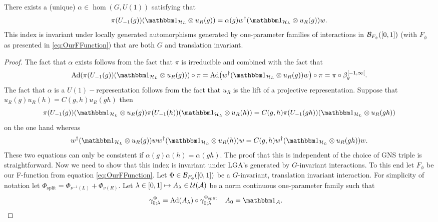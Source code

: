 \documentclass[11pt,a4paper,twoside]{article}
\numberwithin{equation}{section}
\begin{document}
	\begin{lemma}
		There exists a (unique) $\alpha\in\hom(G,U(1))$ satisfying that
		\begin{equation}
			\pi(U_{-1}(g)) (\id_{\HH_L}\otimes u_R(g))=\alpha(g)w^\dagger(\id_{\HH_L}\otimes u_R(g)) w.
		\end{equation}
		This index is invariant under locally generated automorphisms generated by one-parameter families of interactions in $\mathcal B_{F_\phi}([0,1])$ (with $F_\phi$ as presented in \eqref{eq:OurFFunction}) that are both $G$ and translation invariant.
	\end{lemma}
	\begin{proof}
		The fact that $\alpha$ exists follows from the fact that $\pi$ is irreducible and combined with the fact that
		\begin{equation}
			\Ad{\pi(U_{-1}(g)) (\id_{\HH_L}\otimes u_R(g))}\circ\pi=\Ad{w^\dagger(\id_{\HH_L}\otimes u_R(g)) w}\circ\pi=\pi\circ\beta_g^{[-1,\infty[}.
		\end{equation}
		The fact that $\alpha$ is a $U(1)-$representation follows from the fact that $u_R$ is the lift of a projective representation. Suppose that $u_R(g)u_R(h)=C(g,h)u_R(gh)$ then
		\begin{equation}
			\pi(U_{-1}(g)) (\id_{\HH_L}\otimes u_R(g))\pi(U_{-1}(h)) (\id_{\HH_L}\otimes u_R(h))=C(g,h)\pi(U_{-1}(gh)) (\id_{\HH_L}\otimes u_R(gh))
		\end{equation}
		on the one hand whereas
		\begin{equation}
			w^\dagger(\id_{\HH_L}\otimes u_R(g)) ww^\dagger(\id_{\HH_L}\otimes u_R(h)) w=C(g,h)w^\dagger(\id_{\HH_L}\otimes u_R(gh)) w.
		\end{equation}
		These two equations can only be consistent if $\alpha(g)\alpha(h)=\alpha(gh)$. The proof that this is independent of the choice of GNS triple is straightforward. Now we need to show that this index is invariant under LGA's generated by $G$-invariant interactions. To this end let $F_\phi$ be our F-function from equation \eqref{eq:OurFFunction}. Let $\Phi\in\mathcal B_{F_\phi}([0,1])$ be a $G$-invariant, translation invariant interaction. For simplicity of notation let $\Phi_{\text{split}}=\Phi_{\nu^{-1}(L)}+\Phi_{\nu(R)}$. Let $\lambda\in[0,1]\mapsto A_\lambda\in\mathcal U(\mathcal A)$ be a norm continuous one-parameter family such that
		\begin{align}\label{eq:DefinitionSplitting1DAppendix}
			\gamma^\Phi_{0;\lambda}&=\Ad{A_\lambda}\circ\gamma^{\Phi_{\text{split}}}_{0;\lambda}&A_0&=\id_\AA.
		\end{align}

\end{proof}
\end{document}
